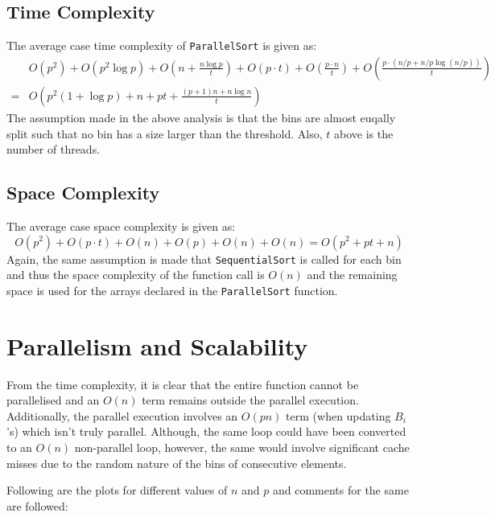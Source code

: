 \documentclass[11pt]{article}
\begin{document}
\subsection{Time Complexity}
The average case time complexity of \texttt{ParallelSort} is given as:
\begin{equation}
	\begin{split}
		&O(p^2) + O(p^2 \log{p}) + O\left(n + \frac{n \log{p}}{t}\right) + O(p\cdot t) + O\left(\frac{p\cdot n}{t}\right) + O\left(\frac{p\cdot (n/p + n/p\log(n/p))}{t}\right)\\
		=&O\left(p^2(1 + \log{p}) + n + pt + \frac{(p + 1)n + n\log{n}}{t}\right)
	\end{split}
\end{equation}
The assumption made in the above analysis is that the bins are almost euqally split such that no bin has a size larger than the threshold. Also, $t$ above is the number of threads.

\subsection{Space Complexity}
The average case space complexity is given as:
\begin{equation}
	O(p^2) + O(p\cdot t) + O(n) + O(p) + O(n) + O(n) = O(p^2 + pt + n)
\end{equation}
Again, the same assumption is made that \texttt{SequentialSort} is called for each bin and thus the space complexity of the function call is $O(n)$ and the remaining space is used for the arrays declared in the \texttt{ParallelSort} function.

\section{Parallelism and Scalability}
From the time complexity, it is clear that the entire function cannot be parallelised and an $O(n)$ term remains outside the parallel execution. Additionally, the parallel execution involves an $O(pn)$ term (when updating $B_i$'s) which isn't truly parallel. Although, the same loop could have been converted to an $O(n)$ non-parallel loop, however, the same would involve significant cache misses due to the random nature of the bins of consecutive elements.\par
Following are the plots for different values of $n$ and $p$ and comments for the same are followed:
\end{document}

